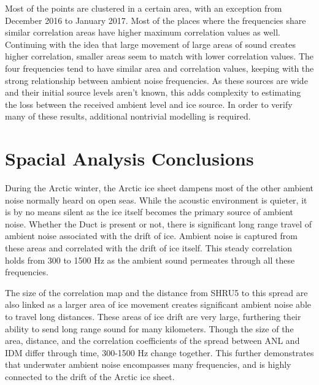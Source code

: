 Most of the points are clustered in a certain area, with an exception from December 2016 to January 2017. Most of the places where the frequencies share similar correlation areas have higher maximum correlation values as well. Continuing with the idea that large movement of large areas of sound creates higher correlation, smaller areas seem to match with lower correlation values. The four frequencies tend to have similar area and correlation values, keeping with the strong relationship between ambient noise frequencies. As these sources are wide and their initial source levels aren't known, this adds complexity to estimating the loss between the received ambient level and ice source. In order to verify many of these results, additional nontrivial modelling is required. 







\section{Spacial Analysis Conclusions} %

%
During the Arctic winter, the Arctic ice sheet dampens most of the other ambient noise normally heard on open seas. While the acoustic environment is quieter, it is by no means silent as the ice itself becomes the primary source of ambient noise.  Whether the Duct is present or not, there is significant long range travel of ambient noise associated with the drift of ice. Ambient noise is captured from these areas and correlated with the drift of ice itself. This steady correlation holds from 300 to 1500 Hz as the ambient sound permeates through all these frequencies.

The size of the correlation map and the distance from SHRU5 to this spread are also linked as a larger area of ice movement creates significant ambient noise able to travel long distances. These areas of ice drift are very large, furthering their ability to send long range sound for many kilometers. Though the size of the area, distance, and the correlation coefficients of the spread between ANL and IDM differ through time, 300-1500 Hz change together. This further demonstrates that underwater ambient noise encompasses many frequencies, and is highly connected to the drift of the Arctic ice sheet. 







